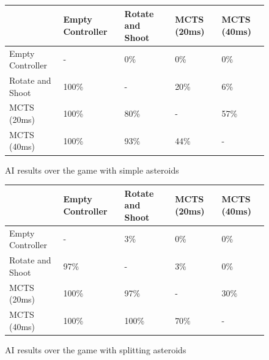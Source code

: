 \begin{figure}
	\caption{AI results over the game with simple asteroids}
	\begin{tabular}{p{7.5em} | p{4.5em} p{4.5em} p{4.5em} p{4.5em}}
		&
			Empty Controller &
			Rotate and Shoot &
			MCTS (20ms) &
			MCTS (40ms) \\ \hline
		Empty Controller &
			-&
			0\% &
			0\% &
			0\% \\
		Rotate and Shoot &
			100\% &
			-&
			20\% &
			6\% \\ 
		MCTS (20ms) &
			100\% &
			80\% &
			-&
			57\% \\
		MCTS (40ms) &
			100\% &
			93\% &
			44\% &
			-\\
	\end{tabular}
\end{figure}

\begin{figure}
	\caption{AI results over the game with splitting asteroids}
	\begin{tabular}{p{7.5em} | p{4.5em} p{4.5em} p{4.5em} p{4.5em}}
		&
			Empty Controller &
			Rotate and Shoot &
			MCTS (20ms) &
			MCTS (40ms) \\ \hline
		Empty Controller &
			-&
			3\% &
			0\% &	
			0\% \\
		Rotate and Shoot &
			97\% &
			-&
			3\% &
			0\% \\ 
		MCTS (20ms) &
			100\% &
			97\% &
			-&
			30\% \\
		MCTS (40ms) &
			100\% &
			100\% &
			70\% &
			-\\
	\end{tabular}
\end{figure}

